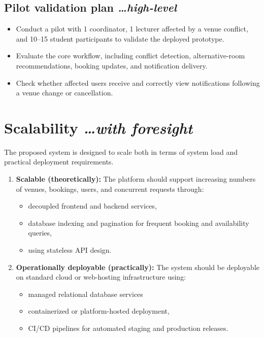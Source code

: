 \documentclass[11pt,a4paper]{article}
\newcommand{\BvrHint}[1]{%
  {\normalfont\normalsize\itshape\hfill #1}}
\begin{document}
\subsection{Pilot validation plan %
\BvrHint{\ldots high-level}}
\begin{itemize}[leftmargin=0.7cm]
    \item Conduct a pilot with 1 coordinator, 1 lecturer affected by a venue conflict, and 10–15 student participants to validate the deployed prototype.
    \item Evaluate the core workflow, including conflict detection, alternative-room recommendations, booking updates, and notification delivery.
    \item Check whether affected users receive and correctly view notifications following a venue change or cancellation.
\end{itemize}


\section{Scalability %
\BvrHint{\ldots with foresight}}
The proposed system is designed to scale both in terms of system load and practical deployment requirements.

\begin{enumerate}[leftmargin=0.7cm]
    \item \textbf{Scalable (theoretically):} The platform should support increasing numbers of venues, bookings, users, and concurrent requests through:
    \begin{itemize}[leftmargin=0.7cm]
        \item decoupled frontend and backend services,
        \item database indexing and pagination for frequent booking and availability queries,
        \item using stateless API design.
    \end{itemize}
    
    \item \textbf{Operationally deployable (practically):} The system should be deployable on standard cloud or web-hosting infrastructure using:
    \begin{itemize}[leftmargin=0.7cm]
        \item managed relational database services
        \item containerized or platform-hosted deployment,
        \item CI/CD pipelines for automated staging and production releases.
    \end{itemize}
\end{enumerate}
\end{document}
